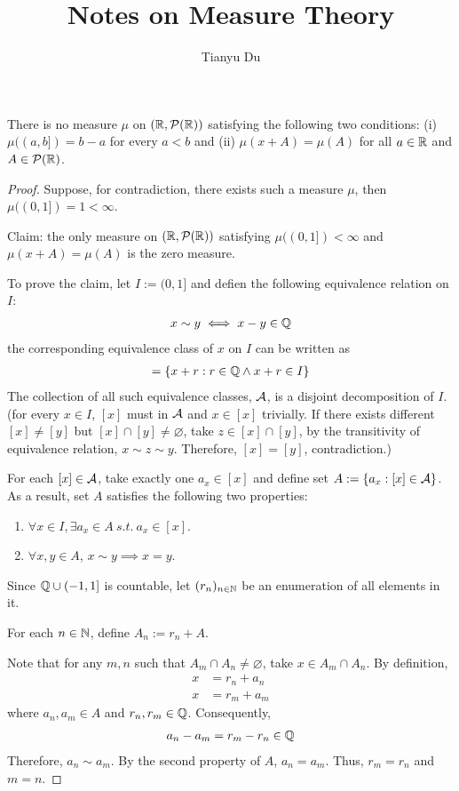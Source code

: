 \documentclass[11pt]{article}
\title{Notes on Measure Theory}
\author{Tianyu Du}
\begin{document}
	\maketitle
	\begin{theorem}
		There is no measure $\mu$ on $(\mathbb{R}, \mathcal{{P}}(\mathbb{R}))$ satisfying the following two conditions: (i) $\mu((a, b]) = b-a$ for every $a < b$ and (ii) $\mu(x+A) = \mu(A)$ for all $a \in \mathbb{R}$ and $A \in \mathcal{{P}}(\mathbb{R})$. 
	\end{theorem}
	
	\begin{proof}
		Suppose, for contradiction, there exists such a measure $\mu$, then $\mu((0, 1]) = 1 < \infty$.
		
		Claim: the only measure on $(\mathbb{R}, \mathcal{{P}}(\mathbb{R}))$ satisfying $\mu((0, 1]) < \infty$ and $\mu(x+A) = \mu(A)$ is the zero measure.
		
		To prove the claim, let $I := (0, 1]$ and defien the following equivalence relation on $I$:
		\begin{align}
			x \sim y \iff x - y \in \mathbb{Q}
		\end{align}
		the corresponding equivalence class of $x$ on $I$ can be written as
		\begin{align}
			[x] = \{x+r: r \in \Q \land x+r \in I\}
		\end{align}
		The collection of all such equivalence classes, $\mathcal{{A}}$, is a disjoint decomposition of $I$. (for every $x \in I$, $[x]$ must in $\mathcal{{A}}$ and $x \in [x]$ trivially. If there exists different $[x] \neq [y]$ but $[x] \cap [y] \neq \varnothing$, take $z \in [x] \cap [y]$, by the transitivity of equivalence relation, $x \sim z \sim y$. Therefore, $[x] = [y]$, contradiction.)
		
		For each $[x] \in \mathcal{{A}}$, take exactly one $a_x \in [x]$ and define set $A := \{a_x: [x] \in \mathcal{{A}}\}$. As a result, set $A$ satisfies the following two properties:
		\begin{enumerate}
			\item $\forall x \in I, \exists a_x \in A\ s.t.\ a_x \in [x]$.
			\item $\forall x, y \in A$, $x \sim y \implies x = y$.
		\end{enumerate}
		Since $\mathbb{Q} \cup (-1, 1]$ is countable, let $(r_n)_{n \in \mathbb{N}}$ be an enumeration of all elements in it.
		
		For each $n \in \mathbb{N}$, define $A_n := r_n + A$.
		
		Note that for any $m, n$ such that $A_m \cap A_n \neq \varnothing$, take $x \in A_m \cap A_n$. By definition, 
		\begin{align}
				x &= r_n + a_n \\
				x &= r_m + a_m
		\end{align}
		where $a_n, a_m \in A$ and $r_n, r_m \in \mathbb{Q}$. Consequently,
		\begin{align}
			a_n - a_m = r_m - r_n \in \mathbb{Q}
		\end{align}
		Therefore, $a_n \sim a_m$. By the second property of $A$, $a_n = a_m$. Thus, $r_m = r_n$ and $m = n$.
		

\end{proof}
\end{document}
